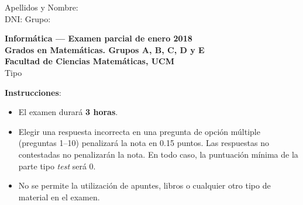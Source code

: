 \documentclass[10pt]{examdesign}
\begin{document}
\begin{examtop}
    \noindent Apellidos y Nombre:\dotfill \\
    \noindent DNI: \dotfill Grupo: \dotfill \\
  \begin{center}
    \textbf{Informática --- Examen parcial de enero 2018} \\
    \textbf{Grados en Matemáticas. Grupos A, B, C, D y E} \\
    \textbf{Facultad de Ciencias Matemáticas, UCM} \\
    Tipo \\
  \end{center}
\end{examtop}

\begin{exampreface}
\textbf{Instrucciones}:~\\
\begin{itemize}
\item El examen durará \textbf{3 horas}.
\item Elegir una respuesta incorrecta en una pregunta de opción múltiple (preguntas 1--10) penalizará la nota en 0.15 puntos. Las respuestas no contestadas no penalizarán la nota. En todo caso, la puntuación mínima de la parte tipo \textit{test} será 0.
\item No se permite la utilización de apuntes, libros o cualquier otro tipo de material en el examen.

\end{itemize}



\end{exampreface}
\end{document}
